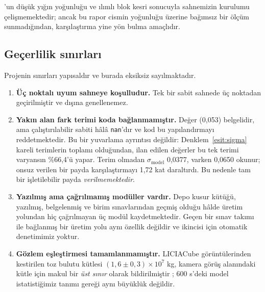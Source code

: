 \documentclass[12pt,a4paper]{article}
\begin{document}
\citet{raducan2024}'un düşük yığın yoğunluğu ve ılımlı blok kesri
sonucuyla sahnemizin kurulumu çelişmemektedir; ancak bu rapor cismin
yoğunluğu üzerine bağımsız bir ölçüm sunmadığından, karşılaştırma yine
yön bulma amaçlıdır.

\subsection{Geçerlilik sınırları}

Projenin sınırları yapısaldır ve burada eksiksiz sayılmaktadır.

\begin{enumerate}[leftmargin=9mm,itemsep=2pt,topsep=3pt]
\item \textbf{Üç noktalı uyum sahneye koşulludur.} Tek bir sabit sahnede
      üç noktadan geçirilmiştir ve dışına genellenemez.

\item \textbf{Yakın alan fark terimi koda bağlanmamıştır.} Değer (0,053)
      belgelidir, ama çalıştırılabilir sabiti hâlâ \texttt{nan}'dır ve
      kod bu yapılandırmayı reddetmektedir. Bu bir yuvarlama ayrıntısı
      değildir: Denklem~\eqref{esit:sigma} kareli terimlerin toplamı
      olduğundan, ilan edilen değerler bu tek terimi varyansın
      \%66,4'ü yapar. Terim olmadan $\sigma_{\mathrm{model}}$ 0,0377,
      varken 0,0650 okunur; onsuz verilen bir payda karşılaştırmayı 1,72
      kat daraltırdı. Bu nedenle tam bir işletilebilir payda
      \emph{verilmemektedir}.

\item \textbf{Yazılmış ama çağrılmamış modüller vardır.} Depo kusur
      kütüğü, yazılmış, belgelenmiş ve birim sınavlarından geçmiş olduğu
      hâlde üretim yolundan hiç çağrılmayan üç modül kaydetmektedir.
      Geçen bir sınav takımı ile bağlanmış bir üretim yolu aynı özellik
      değildir ve ikincisi için otomatik denetimimiz yoktur.

\item \textbf{Gözlem eşleştirmesi tamamlanmamıştır.} LICIACube
      görüntülerinden kestirilen toz bulutu kütlesi
      $(1{,}6\pm0{,}3)\times10^{7}$ kg, kamera görüş alanındaki kütle
      için makul bir \emph{üst sınır} olarak bildirilmiştir
      \citep{lolachi2025}; 600 s'deki model istatistiğimiz tanımı gereği
      aynı büyüklük değildir.


\end{enumerate}
\end{document}

